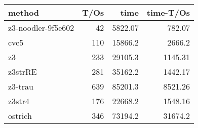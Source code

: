 \begin{tabular}{lrrr}
\hline
 method             &   T/Os &     time &   time-T/Os \\
\hline
 z3-noodler-9f5e602 &     42 &  5822.07 &      782.07 \\
 cvc5               &    110 & 15866.2  &     2666.2  \\
 z3                 &    233 & 29105.3  &     1145.31 \\
 z3strRE            &    281 & 35162.2  &     1442.17 \\
 z3-trau            &    639 & 85201.3  &     8521.26 \\
 z3str4             &    176 & 22668.2  &     1548.16 \\
 ostrich            &    346 & 73194.2  &    31674.2  \\
\hline
\end{tabular}
